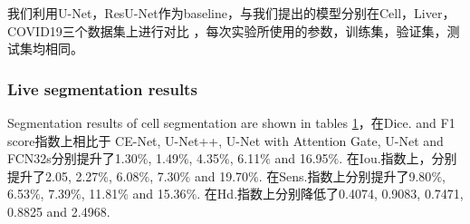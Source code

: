 \documentclass{ieeeaccess}
\begin{document}
我们利用U-Net，ResU-Net作为baseline，与我们提出的模型分别在Cell，Liver，COVID19三个数据集上进行对比
，每次实验所使用的参数，训练集，验证集，测试集均相同。
\subsubsection{Live segmentation results}
Segmentation results of cell segmentation are shown in tables \ref{dataset-table}，在Dice. and F1 score指数上相比于
CE-Net, U-Net++, U-Net with Attention Gate, U-Net and FCN32s分别提升了1.30\(\%\), 1.49\(\%\), 4.35\(\%\), 6.11\(\%\) and 16.95\(\%\).
在Iou.指数上，分别提升了2.05, 2.27\(\%\), 6.08\(\%\), 7.30\(\%\) and 19.70\(\%\). 在Sens.指数上分别提升了9.80\(\%\), 6.53\(\%\), 7.39\(\%\), 
11.81\(\%\) and 15.36\(\%\). 在Hd.指数上分别降低了0.4074, 0.9083, 0.7471, 0.8825 and 2.4968.
  \begin{table}[htbp]
    \vspace{-2mm}
    \begin{center}\small
    \label{dataset-table}
    \begin{tabular}{cccccccc}
      

\end{tabular}
\end{center}
\end{table}
\end{document}
